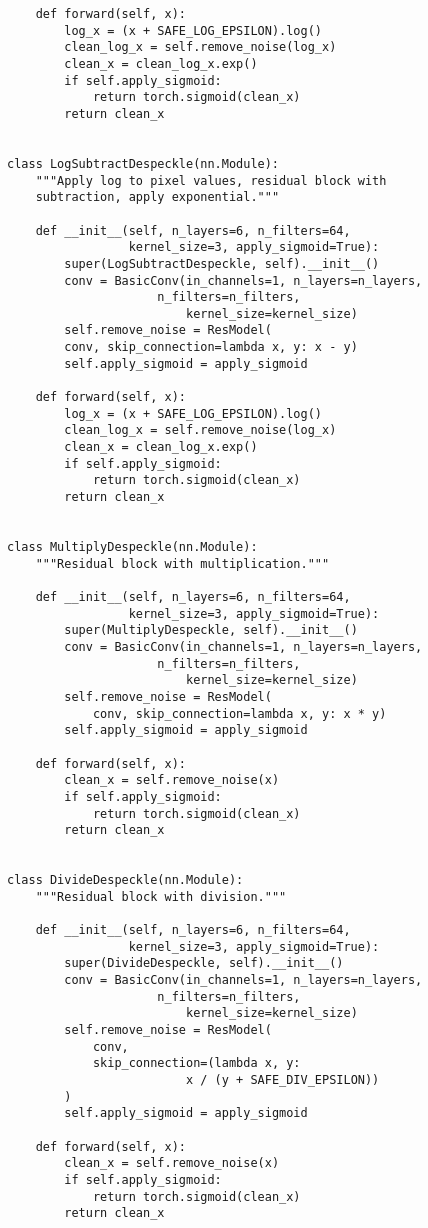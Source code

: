 \documentclass[../main.tex]{subfiles}
\begin{document}
\begin{lstlisting}
    def forward(self, x):
        log_x = (x + SAFE_LOG_EPSILON).log()
        clean_log_x = self.remove_noise(log_x)
        clean_x = clean_log_x.exp()
        if self.apply_sigmoid:
            return torch.sigmoid(clean_x)
        return clean_x


class LogSubtractDespeckle(nn.Module):
    """Apply log to pixel values, residual block with
    subtraction, apply exponential."""

    def __init__(self, n_layers=6, n_filters=64,
                 kernel_size=3, apply_sigmoid=True):
        super(LogSubtractDespeckle, self).__init__()
        conv = BasicConv(in_channels=1, n_layers=n_layers,
	                 n_filters=n_filters,
                         kernel_size=kernel_size)
        self.remove_noise = ResModel(
	    conv, skip_connection=lambda x, y: x - y)
        self.apply_sigmoid = apply_sigmoid

    def forward(self, x):
        log_x = (x + SAFE_LOG_EPSILON).log()
        clean_log_x = self.remove_noise(log_x)
        clean_x = clean_log_x.exp()
        if self.apply_sigmoid:
            return torch.sigmoid(clean_x)
        return clean_x


class MultiplyDespeckle(nn.Module):
    """Residual block with multiplication."""

    def __init__(self, n_layers=6, n_filters=64,
                 kernel_size=3, apply_sigmoid=True):
        super(MultiplyDespeckle, self).__init__()
        conv = BasicConv(in_channels=1, n_layers=n_layers,
	                 n_filters=n_filters,
                         kernel_size=kernel_size)
        self.remove_noise = ResModel(
        	conv, skip_connection=lambda x, y: x * y)
        self.apply_sigmoid = apply_sigmoid

    def forward(self, x):
        clean_x = self.remove_noise(x)
        if self.apply_sigmoid:
            return torch.sigmoid(clean_x)
        return clean_x


class DivideDespeckle(nn.Module):
    """Residual block with division."""

    def __init__(self, n_layers=6, n_filters=64,
                 kernel_size=3, apply_sigmoid=True):
        super(DivideDespeckle, self).__init__()
        conv = BasicConv(in_channels=1, n_layers=n_layers,
	                 n_filters=n_filters,
                         kernel_size=kernel_size)
        self.remove_noise = ResModel(
            conv,
            skip_connection=(lambda x, y:
	                     x / (y + SAFE_DIV_EPSILON))
        )
        self.apply_sigmoid = apply_sigmoid

    def forward(self, x):
        clean_x = self.remove_noise(x)
        if self.apply_sigmoid:
            return torch.sigmoid(clean_x)
        return clean_x
\end{lstlisting}
\end{document}
